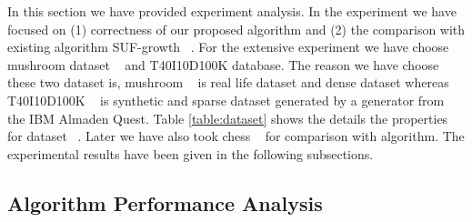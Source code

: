 In this section we have provided experiment analysis. In the experiment we have focused on (1) correctness of our proposed algorithm and (2) the comparison with existing algorithm SUF-growth ~\cite{suf_growth}. For the extensive experiment we have choose mushroom dataset ~\cite{dataset} and T40I10D100K database. The reason we have choose these two dataset is, mushroom ~\cite{dataset} is real life dataset and dense dataset whereas T40I10D100K ~\cite{dataset} is synthetic and sparse dataset generated by a generator from the IBM Almaden Quest. Table \ref{table:dataset} shows the details the properties for dataset ~\cite{dataset}. Later we have also took chess ~\cite{dataset} for comparison with algorithm. The experimental results have been given in the following subsections.
\subsection{Algorithm Performance Analysis}
